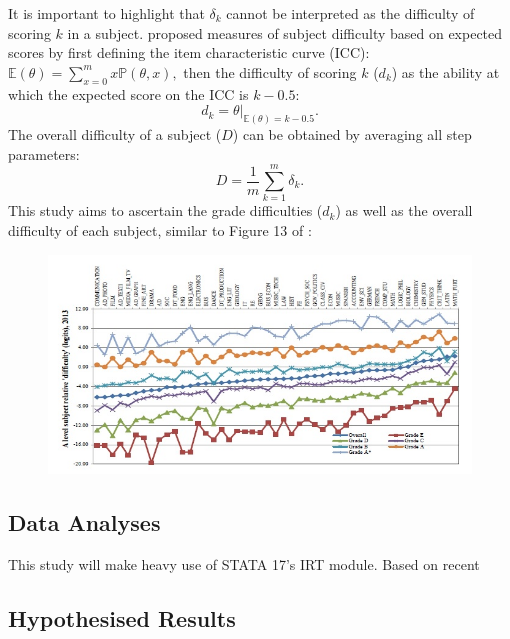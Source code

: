 \documentclass[
    a4paper,            %
    11pt,               %
    stu,                %
    donotrepeattitle,   %
    noextraspace,       %
    floatsintext,       %
    biblatex,           %
    colorlinks=true,        %
    linkcolor=red,          %
    anchorcolor=black,      %
    citecolor=blue,         %
    urlcolor=blue,          %
    bookmarks=true,         %
    bookmarksopen=false,    %
    bookmarksnumbered=true  %
]{apa7}
\newcommand{\p}[1]{\mathbb{P}\left(#1\right)}
\newcommand{\E}[1]{\mathbb{E}\left(#1\right)}
\begin{document}
It is important to highlight that $\delta_k$ cannot be interpreted as the difficulty of scoring $k$ in a subject. \textcite{wu:2007} proposed measures of subject difficulty based on expected scores by first defining the item characteristic curve (ICC):
    $ \E{\theta} = \sum_{x=0}^m x\p{\theta,x}, $
then the difficulty of scoring $k$ ($d_k$) as the ability at which the expected score on the ICC is $k-0.5$:
\begin{equation}
    d_k = \theta | _{\E{\theta} = k - 0.5}.
\end{equation}
The overall difficulty of a subject ($D$) can be obtained by averaging all step parameters:
\begin{equation}
    D = \frac{1}{m} \sum_{k=1}^m \delta_k.
\end{equation}
This study aims to ascertain the grade difficulties ($d_k$) as well as the overall difficulty of each subject, similar to Figure 13 of \textcite{he:2015}:
\begin{figure}[ht]
    \includegraphics[scale=1]{expected_result.jpg}
    \centering
\end{figure}

\subsection{Data Analyses}

This study will make heavy use of STATA 17's IRT module. Based on recent 

\subsection{Hypothesised Results}

\printbibliography
\end{document}
